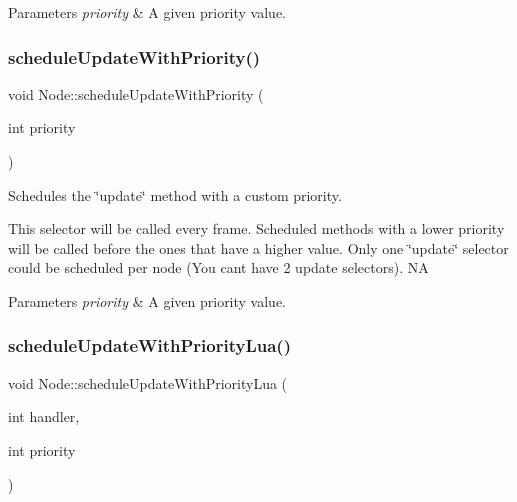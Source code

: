 \begin{DoxyParams}{Parameters}
{\em priority} & A given priority value. \\
\hline
\end{DoxyParams}
\mbox{\label{classNode_aa86137d5229cb83acf5cee129a83b818}} 
\subsubsection{\texorpdfstring{schedule\+Update\+With\+Priority()}{scheduleUpdateWithPriority()}\hspace{0.1cm}{\footnotesize\ttfamily [2/2]}}
{\footnotesize\ttfamily void Node\+::schedule\+Update\+With\+Priority (\begin{DoxyParamCaption}\item[{int}]{priority }\end{DoxyParamCaption})}

Schedules the \char`\"{}update\char`\"{} method with a custom priority.

This selector will be called every frame. Scheduled methods with a lower priority will be called before the ones that have a higher value. Only one \char`\"{}update\char`\"{} selector could be scheduled per node (You can\textquotesingle{}t have 2 \textquotesingle{}update\textquotesingle{} selectors).  NA


\begin{DoxyParams}{Parameters}
{\em priority} & A given priority value. \\
\hline
\end{DoxyParams}
\mbox{\label{classNode_a0fc543c82cc9b139cfb57f65eb770fb0}} 
\subsubsection{\texorpdfstring{schedule\+Update\+With\+Priority\+Lua()}{scheduleUpdateWithPriorityLua()}\hspace{0.1cm}{\footnotesize\ttfamily [1/2]}}
{\footnotesize\ttfamily void Node\+::schedule\+Update\+With\+Priority\+Lua (\begin{DoxyParamCaption}\item[{int}]{handler,  }\item[{int}]{priority }\end{DoxyParamCaption})}

